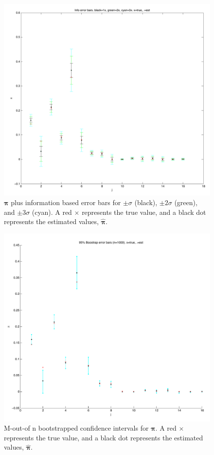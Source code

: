 \documentclass[12pt]{amsart}
\newcommand{\vect}[1]{\boldsymbol{\mathbf{#1}}}
\newcommand{\vp}{\vect{\pi}}
\newcommand{\vph}{\hat{\vect{\pi}}}
\begin{document}
\begin{figure}
	
	\begin{center}
		\includegraphics[scale=0.6]{info_error_bars.pdf}
	\end{center}
	\caption{$\vp$ plus information based error bars for $\pm \sigma$ (black), $\pm 2\sigma$ (green), and $\pm 3\sigma$ (cyan). A red $\times$ represents the true value, and a black dot represents the estimated values, $\vph$.}
\end{figure}


\begin{figure}
	
	\begin{center}
		\includegraphics[scale=0.6]{boot_mn_error_bars.pdf}
	\end{center}
	\caption{M-out-of n bootstrapped confidence intervals for $\vp$. A red $\times$ represents the true value, and a black dot represents the estimated values, $\vph$.}
\end{figure}
\end{document}
